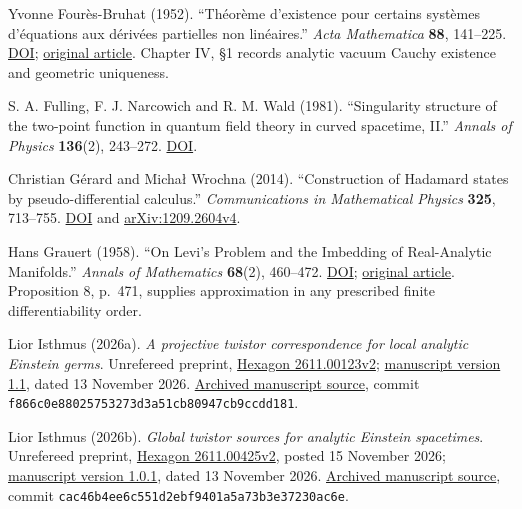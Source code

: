 \documentclass[
  english,
  11pt,
  reqno]{amsart}
\begin{document}
\begin{thebibliography}{}
\leavevmode{}\label{ref-FouresBruhat1952}%
Yvonne Fourès-Bruhat (1952). ``Théorème d'existence pour certains
systèmes d'équations aux dérivées partielles non linéaires.'' \emph{Acta
Mathematica} \textbf{88}, 141--225.
\href{https://doi.org/10.1007/BF02392131}{DOI};
\href{https://archive.ymsc.tsinghua.edu.cn/pacm_download/117/5764-11511_2006_Article_BF02392131.pdf}{original
article}. Chapter IV, §1 records analytic vacuum Cauchy existence and
geometric uniqueness.

\leavevmode{}\label{ref-FullingNarcowichWald1981}%
S. A. Fulling, F. J. Narcowich and R. M. Wald (1981). ``Singularity
structure of the two-point function in quantum field theory in curved
spacetime, II.'' \emph{Annals of Physics} \textbf{136}(2), 243--272.
\href{https://doi.org/10.1016/0003-4916(81)90098-1}{DOI}.

\leavevmode{}\label{ref-GerardWrochna2014}%
Christian Gérard and Michał Wrochna (2014). ``Construction of Hadamard
states by pseudo-differential calculus.'' \emph{Communications in
Mathematical Physics} \textbf{325}, 713--755.
\href{https://doi.org/10.1007/s00220-013-1824-9}{DOI} and
\href{https://arxiv.org/abs/1209.2604v4}{arXiv:1209.2604v4}.

\leavevmode{}\label{ref-Grauert1958}%
Hans Grauert (1958). ``On Levi's Problem and the Imbedding of
Real-Analytic Manifolds.'' \emph{Annals of Mathematics} \textbf{68}(2),
460--472. \href{https://doi.org/10.2307/1970257}{DOI};
\href{https://www.math.ens.psl.eu/~benoist/refs/Grauert.pdf}{original
article}. Proposition 8, p.~471, supplies approximation in any
prescribed finite differentiability order.

\leavevmode{}\label{ref-IsthmusProjective2026}%
Lior Isthmus (2026a). \emph{A projective twistor correspondence for
local analytic Einstein germs}. Unrefereed preprint,
\href{https://hexagonmath.org/2611.00123v2}{Hexagon 2611.00123v2};
\href{https://doi.org/10.5281/zenodo.24197319}{manuscript version 1.1},
dated 13 November 2026.
\href{https://github.com/lioristhmus/projective-twistor-einstein-germs/blob/f866c0e88025753273d3a51cb80947cb9ccdd181/release/paper-v1.1/manuscript.md}{Archived
manuscript source}, commit
\texttt{f866c0e88025753273d3a51cb80947cb9ccdd181}.

\leavevmode{}\label{ref-IsthmusGlobal2026}%
Lior Isthmus (2026b). \emph{Global twistor sources for analytic Einstein
spacetimes}. Unrefereed preprint,
\href{https://hexagonmath.org/2611.00425v2}{Hexagon 2611.00425v2},
posted 15 November 2026;
\href{https://doi.org/10.5281/zenodo.24239028}{manuscript version
1.0.1}, dated 13 November 2026.
\href{https://github.com/lioristhmus/global-twistor-sources/blob/cac46b4ee6c551d2ebf9401a5a73b3e37230ac6e/paper/manuscript.md}{Archived
manuscript source}, commit
\texttt{cac46b4ee6c551d2ebf9401a5a73b3e37230ac6e}.


\end{thebibliography}
\end{document}
